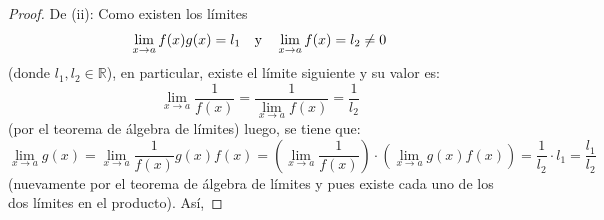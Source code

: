 \documentclass[12pt]{article}
\begin{document}
\begin{enumerate}
\begin{proof}
        De (ii): Como existen los límites
        \begin{equation*}
            \lim_{x\rightarrow a}f(x)g(x)=l_1\quad\textup{y}\quad\lim_{x\rightarrow a}f(x)=l_2\neq 0
        \end{equation*}
        (donde $l_1,l_2\in\mathbb{R}$), en particular, existe el límite siguiente y su valor es:
        \begin{equation*}
            \lim_{x\rightarrow a}\frac{1}{f(x)}=\frac{1}{\lim_{x\rightarrow a}f(x)}=\frac{1}{l_2}
        \end{equation*}
        (por el teorema de álgebra de límites) luego, se tiene que:
        \begin{equation*}
            \lim_{x\rightarrow a }g(x)=\lim_{x\rightarrow a }\frac{1}{f(x)}g(x)f(x)=\left(\lim_{x\rightarrow a }\frac{1}{f(x)}\right)\cdot\left(\lim_{x\rightarrow a }g(x)f(x)\right)=\frac{1}{l_2}\cdot l_1=\frac{l_1}{l_2}
        \end{equation*}
        (nuevamente por el teorema de álgebra de límites y pues existe cada uno de los dos límites en el producto). Así, 
    \end{proof}


\end{enumerate}
\end{document}
